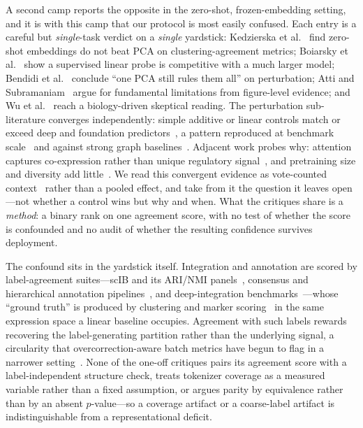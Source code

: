 \documentclass[11pt]{article}
\begin{document}
A second camp reports the opposite in the zero-shot, frozen-embedding setting, and it is with this camp that our protocol is most easily confused. Each entry is a careful but \emph{single}-task verdict on a \emph{single} yardstick: Kedzierska et al.~\cite{kedzierska2025} find zero-shot embeddings do not beat PCA on clustering-agreement metrics; Boiarsky et al.~\cite{boiarsky2024} show a supervised linear probe is competitive with a much larger model; Bendidi et al.~\cite{bendidi2024} conclude ``one PCA still rules them all'' on perturbation; Atti and Subramaniam~\cite{atti2025} argue for fundamental limitations from figure-level evidence; and Wu et al.~\cite{wu2025} reach a biology-driven skeptical reading. The perturbation sub-literature converges independently: simple additive or linear controls match or exceed deep and foundation predictors~\cite{wongpfizer2025,kernfeld2025,csendes2025,ahlmann2025}, a pattern reproduced at benchmark scale~\cite{perteval2024,scperturbench2025,systema2026} and against strong graph baselines~\cite{roohani2024}. Adjacent work probes why: attention captures co-expression rather than unique regulatory signal~\cite{kendiukhov2026}, and pretraining size and diversity add little~\cite{denadel2026}. We read this convergent evidence as vote-counted context~\cite{borenstein2009} rather than a pooled effect, and take from it the question it leaves open---not whether a control wins but why and when. What the critiques share is a \emph{method}: a binary rank on one agreement score, with no test of whether the score is confounded and no audit of whether the resulting confidence survives deployment.

The confound sits in the yardstick itself. Integration and annotation are scored by label-agreement suites---scIB and its ARI/NMI panels~\cite{luecken2022}, consensus and hierarchical annotation pipelines~\cite{popv2024,hce2026}, and deep-integration benchmarks~\cite{scibe2025}---whose ``ground truth'' is produced by clustering and marker scoring~\cite{wolf2018scanpy,stuart2019seurat} in the same expression space a linear baseline occupies. Agreement with such labels rewards recovering the label-generating partition rather than the underlying signal, a circularity that overcorrection-aware batch metrics have begun to flag in a narrower setting~\cite{rbet2025}. None of the one-off critiques pairs its agreement score with a label-independent structure check, treats tokenizer coverage as a measured variable rather than a fixed assumption, or argues parity by equivalence rather than by an absent $p$-value---so a coverage artifact or a coarse-label artifact is indistinguishable from a representational deficit.
\end{document}
